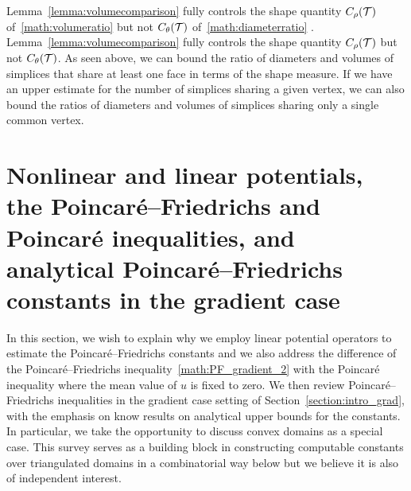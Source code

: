 \documentclass[10pt,a4paper]{article}
\newcommand\cye[1]{%
\protect\leavevmode
\begingroup
    \color{blue}%
    #1%
\endgroup
}
\begin{document}
\begin{remark}
    Lemma~\ref{lemma:volumecomparison} fully controls the shape quantity $C_\rho({\mathcal T})$ \cye{of~\eqref{math:volumeratio}} but not $C_\theta({\mathcal T})$ \cye{of~\eqref{math:diameterratio}}. 
    Lemma~\ref{lemma:volumecomparison} fully controls the shape quantity $C_\rho({\mathcal T})$ but not $C_\theta({\mathcal T})$. 
    As seen above, we can bound the ratio of diameters and volumes of simplices that share at least one face in terms of the shape measure. 
    If we have an upper estimate for the number of simplices sharing a given vertex, 
    we can also bound the ratios of diameters and volumes of simplices sharing only a single common vertex. 
\end{remark}









































\section{{Nonlinear and linear potentials, the Poincar\'e--Friedrichs and Poincar\'e inequalities, and {analytical} Poincar\'e--Friedrichs constants in the gradient case}} \label{section:poincare} 

In this section, we wish to explain why we employ linear potential operators to estimate the Poincar\'e--Friedrichs constants and we also address the difference of the Poincar\'e--Friedrichs inequality~\eqref{math:PF_gradient_2} with the Poincar\'e inequality where the mean value of $u$ is fixed to zero. We then review Poincar\'e--Friedrichs inequalities in the gradient case setting of Section~\ref{section:intro_grad}, with the emphasis on know results on analytical upper bounds for the constants. In particular, we take the opportunity to discuss convex domains as a special case. This survey serves as a building block in constructing computable constants over triangulated domains in a combinatorial way below but we believe it is also of independent interest.
\end{document}
